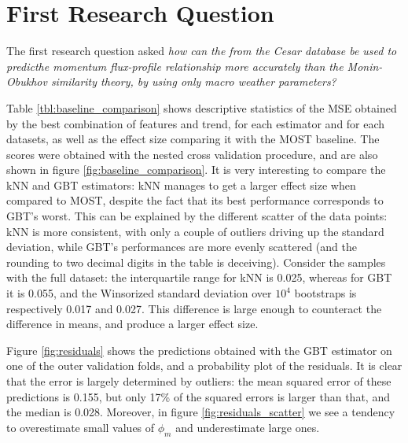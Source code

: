 \documentclass[a4paper]{book}
\begin{document}
\section{First Research Question}
The first research question asked \emph{how can the from the Cesar database be used to predicthe momentum flux-profile relationship more accurately than the Monin-Obukhov similarity theory, by using only macro weather parameters?}

Table \ref{tbl:baseline_comparison} shows descriptive statistics of the MSE obtained by the best combination of features and trend, for each estimator and for each datasets, as well as the effect size comparing it with the MOST baseline. The scores were obtained with the nested cross validation procedure, and are also shown in figure \ref{fig:baseline_comparison}. It is very interesting to compare the kNN and GBT estimators: kNN manages to get a larger effect size when compared to MOST, despite the fact that its best performance corresponds to GBT's worst. This can be explained by the different scatter of the data points: kNN is more consistent, with only a couple of outliers driving up the standard deviation, while GBT's performances are more evenly scattered (and the rounding to two decimal digits in the table is deceiving). Consider the samples with the full dataset: the interquartile range for kNN is 0.025, whereas for GBT it is 0.055, and the Winsorized standard deviation over $10^4$ bootstraps is respectively 0.017 and 0.027. This difference is large enough to counteract the difference in means, and produce a larger effect size.

Figure \ref{fig:residuals} shows the predictions obtained with the GBT estimator on one of the outer validation folds, and a probability plot of the residuals. It is clear that the error is largely determined by outliers: the mean squared error of these predictions is 0.155, but only 17\% of the squared errors is larger than that, and the median is 0.028. Moreover, in figure \ref{fig:residuals_scatter} we see a tendency to overestimate small values of $\phi_m$ and underestimate large ones.
\end{document}
